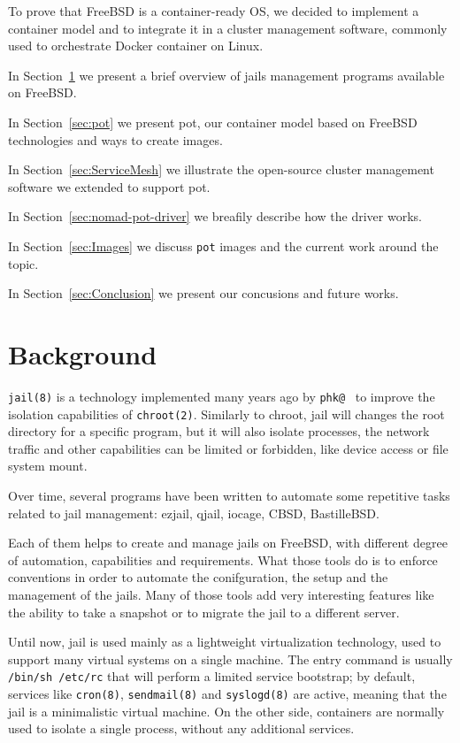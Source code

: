 \documentclass[conference,a4paper,11pt]{IEEEtran}
\begin{document}
To prove that FreeBSD is a container-ready OS, we decided to implement a container model and to integrate it in a cluster management software, commonly used to orchestrate Docker container on Linux.

In Section~\ref{sec:Background}  we present a brief overview of jails management programs available on FreeBSD.\@

In Section~\ref{sec:pot} we present pot, our container model based on FreeBSD technologies and ways to create images.

In Section~\ref{sec:ServiceMesh} we illustrate the open-source cluster management software we extended to support pot.

In Section~\ref{sec:nomad-pot-driver} we breafily describe how the driver works.

In Section~\ref{sec:Images} we discuss \texttt{pot} images and the current work around the topic.

In Section~\ref{sec:Conclusion}  we present our concusions and future works.
 
\section{Background}\label{sec:Background}
\texttt{jail(8)} is a technology implemented many years ago by \texttt{phk@}~\cite{jail} to improve the isolation capabilities of \texttt{chroot(2)}. Similarly to chroot, jail will changes the root directory for a specific program, but it will also isolate processes, the network traffic and other capabilities can be limited or forbidden, like device access or file system mount.

Over time, several programs have been written to automate some repetitive tasks related to jail management: ezjail, qjail, iocage, CBSD, BastilleBSD.\@

Each of them helps to create and manage jails on FreeBSD, with different degree of automation, capabilities and requirements. What those tools do is to enforce conventions in order to automate the conifguration, the setup  and the management of the jails. Many of those tools add very interesting features like the ability to take a snapshot or to migrate the jail to a different server.

Until now, jail is used mainly as a lightweight virtualization technology, used to support many virtual systems on a single machine. The entry command is usually \texttt{/bin/sh /etc/rc} that will perform a limited service bootstrap; by default, services like \texttt{cron(8)}, \texttt{sendmail(8)} and \texttt{syslogd(8)} are active, meaning that the jail is a minimalistic virtual machine. On the other side, containers are normally used to isolate a single process, without any additional services.
\end{document}
